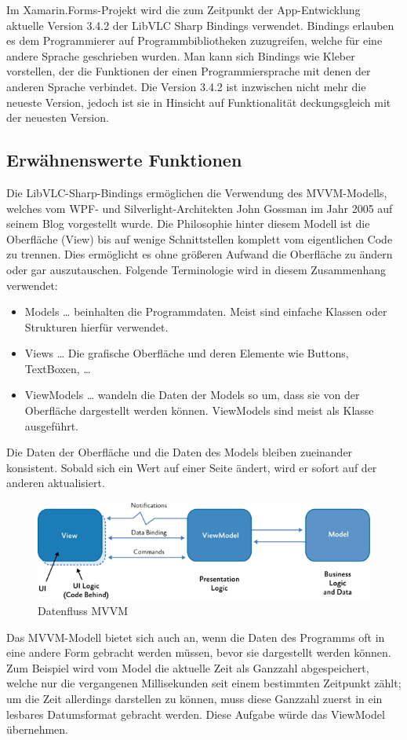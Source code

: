 Im Xamarin.Forms-Projekt wird die zum Zeitpunkt der App-Entwicklung aktuelle Version 3.4.2 der LibVLC Sharp Bindings verwendet. Bindings erlauben es dem Programmierer auf Programmbibliotheken zuzugreifen, welche für eine andere Sprache geschrieben wurden. Man kann sich Bindings wie Kleber vorstellen, der die Funktionen der einen Programmiersprache mit denen der anderen Sprache verbindet. Die Version 3.4.2 ist inzwischen nicht mehr die neueste Version, jedoch  ist sie in Hinsicht auf Funktionalität deckungsgleich mit der neuesten Version.\par

\subsection{Erwähnenswerte Funktionen}
Die LibVLC-Sharp-Bindings ermöglichen die Verwendung des MVVM-Modells, welches vom WPF- und Silverlight-Architekten John Gossman im Jahr 2005 auf seinem Blog vorgestellt wurde. \cite[vlg.][The Evolution of Model-View-ViewModel]{msdoc-mvvm}
Die Philosophie hinter diesem Modell ist die Oberfläche (View) bis auf wenige Schnittstellen komplett vom eigentlichen Code zu trennen.
Dies ermöglicht es ohne größeren Aufwand die Oberfläche zu ändern oder gar auszutauschen.
Folgende Terminologie wird in diesem Zusammenhang verwendet:
\begin{itemize}
\item Models … beinhalten die Programmdaten. Meist sind einfache Klassen oder Strukturen hierfür verwendet.
\item Views … Die grafische Oberfläche und deren Elemente wie Buttons, TextBoxen, …
\item ViewModels … wandeln die Daten der Models so um, dass sie von der Oberfläche dargestellt werden können. ViewModels sind meist als Klasse ausgeführt.
\end{itemize}

Die Daten der Oberfläche und die Daten des Models bleiben zueinander konsistent. Sobald sich ein Wert auf einer Seite ändert, wird er sofort auf der anderen aktualisiert.
\begin{figure}[H]
    \centering
    \includegraphics[width=.9\linewidth]{images/software_module/MVVM.png}
    \caption{Datenfluss MVVM}
\end{figure}
Das MVVM-Modell bietet sich auch an, wenn die Daten des Programms oft in eine andere Form gebracht werden müssen, bevor sie dargestellt werden können. Zum Beispiel wird vom Model die aktuelle Zeit als Ganzzahl abgespeichert, welche nur die vergangenen Millisekunden seit einem bestimmten Zeitpunkt zählt; um die Zeit allerdings darstellen zu können, muss diese Ganzzahl zuerst in ein lesbares Datumsformat gebracht werden. Diese Aufgabe würde das ViewModel übernehmen.

